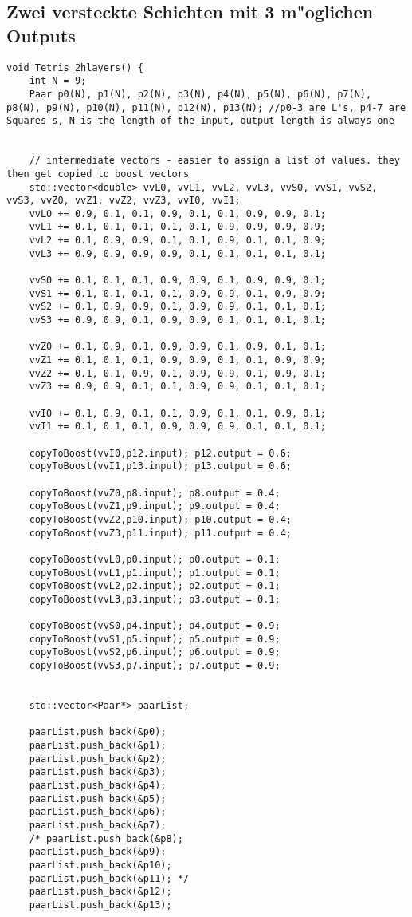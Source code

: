 \documentclass[10pt]{article}
\begin{document}
\subsection{Zwei versteckte Schichten mit 3 m"oglichen Outputs}
\begin{lstlisting}
void Tetris_2hlayers() {
	int N = 9;
	Paar p0(N), p1(N), p2(N), p3(N), p4(N), p5(N), p6(N), p7(N), p8(N), p9(N), p10(N), p11(N), p12(N), p13(N); //p0-3 are L's, p4-7 are Squares's, N is the length of the input, output length is always one
	
	
	// intermediate vectors - easier to assign a list of values. they then get copied to boost vectors
	std::vector<double> vvL0, vvL1, vvL2, vvL3, vvS0, vvS1, vvS2, vvS3, vvZ0, vvZ1, vvZ2, vvZ3, vvI0, vvI1;
	vvL0 += 0.9, 0.1, 0.1, 0.9, 0.1, 0.1, 0.9, 0.9, 0.1;
	vvL1 += 0.1, 0.1, 0.1, 0.1, 0.1, 0.9, 0.9, 0.9, 0.9;
	vvL2 += 0.1, 0.9, 0.9, 0.1, 0.1, 0.9, 0.1, 0.1, 0.9;
	vvL3 += 0.9, 0.9, 0.9, 0.9, 0.1, 0.1, 0.1, 0.1, 0.1;

	vvS0 += 0.1, 0.1, 0.1, 0.9, 0.9, 0.1, 0.9, 0.9, 0.1;
	vvS1 += 0.1, 0.1, 0.1, 0.1, 0.9, 0.9, 0.1, 0.9, 0.9;
	vvS2 += 0.1, 0.9, 0.9, 0.1, 0.9, 0.9, 0.1, 0.1, 0.1;
	vvS3 += 0.9, 0.9, 0.1, 0.9, 0.9, 0.1, 0.1, 0.1, 0.1;

	vvZ0 += 0.1, 0.9, 0.1, 0.9, 0.9, 0.1, 0.9, 0.1, 0.1;
	vvZ1 += 0.1, 0.1, 0.1, 0.9, 0.9, 0.1, 0.1, 0.9, 0.9;
	vvZ2 += 0.1, 0.1, 0.9, 0.1, 0.9, 0.9, 0.1, 0.9, 0.1;
	vvZ3 += 0.9, 0.9, 0.1, 0.1, 0.9, 0.9, 0.1, 0.1, 0.1;

	vvI0 += 0.1, 0.9, 0.1, 0.1, 0.9, 0.1, 0.1, 0.9, 0.1;
	vvI1 += 0.1, 0.1, 0.1, 0.9, 0.9, 0.9, 0.1, 0.1, 0.1;

	copyToBoost(vvI0,p12.input); p12.output = 0.6;
	copyToBoost(vvI1,p13.input); p13.output = 0.6;

	copyToBoost(vvZ0,p8.input); p8.output = 0.4;
	copyToBoost(vvZ1,p9.input); p9.output = 0.4;
	copyToBoost(vvZ2,p10.input); p10.output = 0.4;
	copyToBoost(vvZ3,p11.input); p11.output = 0.4;

	copyToBoost(vvL0,p0.input); p0.output = 0.1;
	copyToBoost(vvL1,p1.input); p1.output = 0.1;
	copyToBoost(vvL2,p2.input); p2.output = 0.1;
	copyToBoost(vvL3,p3.input); p3.output = 0.1;

	copyToBoost(vvS0,p4.input); p4.output = 0.9;
	copyToBoost(vvS1,p5.input); p5.output = 0.9;
	copyToBoost(vvS2,p6.input); p6.output = 0.9;
	copyToBoost(vvS3,p7.input); p7.output = 0.9;


	std::vector<Paar*> paarList;

	paarList.push_back(&p0);
	paarList.push_back(&p1);
	paarList.push_back(&p2);
	paarList.push_back(&p3);
	paarList.push_back(&p4);
	paarList.push_back(&p5);
	paarList.push_back(&p6);
	paarList.push_back(&p7);
	/* paarList.push_back(&p8);
	paarList.push_back(&p9);
	paarList.push_back(&p10);
	paarList.push_back(&p11); */
	paarList.push_back(&p12);
	paarList.push_back(&p13);


\end{lstlisting}
\end{document}
